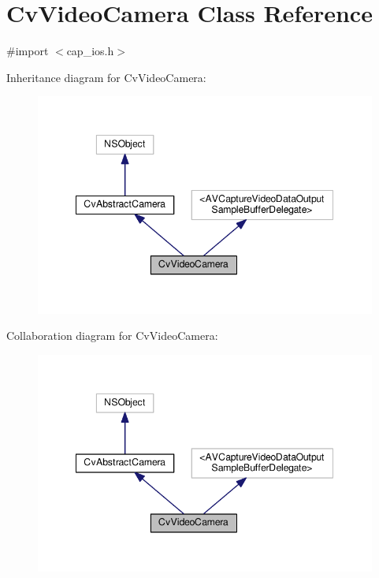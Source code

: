 \hypertarget{interfaceCvVideoCamera}{\section{Cv\-Video\-Camera Class Reference}
\label{interfaceCvVideoCamera}
}


{\ttfamily \#import $<$cap\-\_\-ios.\-h$>$}



Inheritance diagram for Cv\-Video\-Camera\-:\nopagebreak
\begin{figure}[H]
\begin{center}
\leavevmode
\includegraphics[width=345pt]{interfaceCvVideoCamera__inherit__graph}
\end{center}
\end{figure}


Collaboration diagram for Cv\-Video\-Camera\-:\nopagebreak
\begin{figure}[H]
\begin{center}
\leavevmode
\includegraphics[width=345pt]{interfaceCvVideoCamera__coll__graph}
\end{center}
\end{figure}
